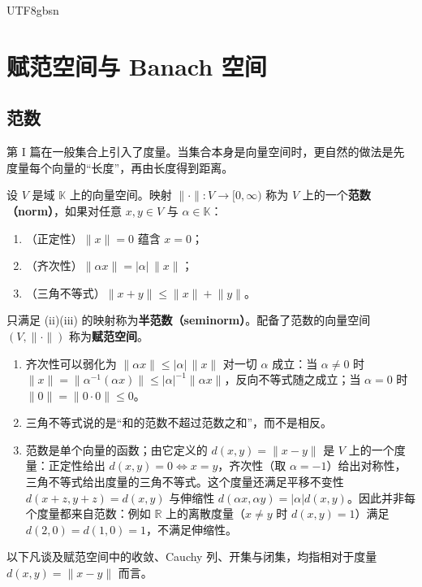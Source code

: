 \documentclass[11pt]{article}
\newcommand{\K}{\mathbb{K}}
\newcommand{\R}{\mathbb{R}}
\newcommand{\norm}[1]{\lVert #1\rVert}
\begin{document}
\begin{CJK*}{UTF8}{gbsn}
\section{赋范空间与 Banach 空间}

\subsection{范数}

第 I 篇在一般集合上引入了度量。当集合本身是向量空间时，更自然的做法是先度量每个向量的“长度”，再由长度得到距离。

\begin{definition}[范数]
设 $V$ 是域 $\K$ 上的向量空间。映射 $\norm{\cdot}:V\to[0,\infty)$ 称为 $V$ 上的一个\textbf{范数（norm）}，如果对任意 $x,y\in V$ 与 $\alpha\in\K$：
\begin{enumerate}
\item （正定性）$\norm{x}=0$ 蕴含 $x=0$；
\item （齐次性）$\norm{\alpha x}=|\alpha|\,\norm{x}$；
\item （三角不等式）$\norm{x+y}\le\norm{x}+\norm{y}$。
\end{enumerate}
只满足 (ii)(iii) 的映射称为\textbf{半范数（seminorm）}。配备了范数的向量空间 $(V,\norm{\cdot})$ 称为\textbf{赋范空间}。
\end{definition}

\begin{remark}
\begin{enumerate}
\item 齐次性可以弱化为 $\norm{\alpha x}\le|\alpha|\,\norm{x}$ 对一切 $\alpha$ 成立：当 $\alpha\ne0$ 时 $\norm{x}=\norm{\alpha^{-1}(\alpha x)}\le|\alpha|^{-1}\norm{\alpha x}$，反向不等式随之成立；当 $\alpha=0$ 时 $\norm{0}=\norm{0\cdot 0}\le 0$。
\item 三角不等式说的是“和的范数不超过范数之和”，而不是相反。
\item 范数是单个向量的函数；由它定义的 $d(x,y)=\norm{x-y}$ 是 $V$ 上的一个度量：正定性给出 $d(x,y)=0\Leftrightarrow x=y$，齐次性（取 $\alpha=-1$）给出对称性，三角不等式给出度量的三角不等式。这个度量还满足平移不变性 $d(x+z,y+z)=d(x,y)$ 与伸缩性 $d(\alpha x,\alpha y)=|\alpha|d(x,y)$。因此并非每个度量都来自范数：例如 $\R$ 上的离散度量（$x\ne y$ 时 $d(x,y)=1$）满足 $d(2,0)=d(1,0)=1$，不满足伸缩性。
\end{enumerate}
\end{remark}

以下凡谈及赋范空间中的收敛、Cauchy 列、开集与闭集，均指相对于度量 $d(x,y)=\norm{x-y}$ 而言。


\end{CJK*}
\end{document}
